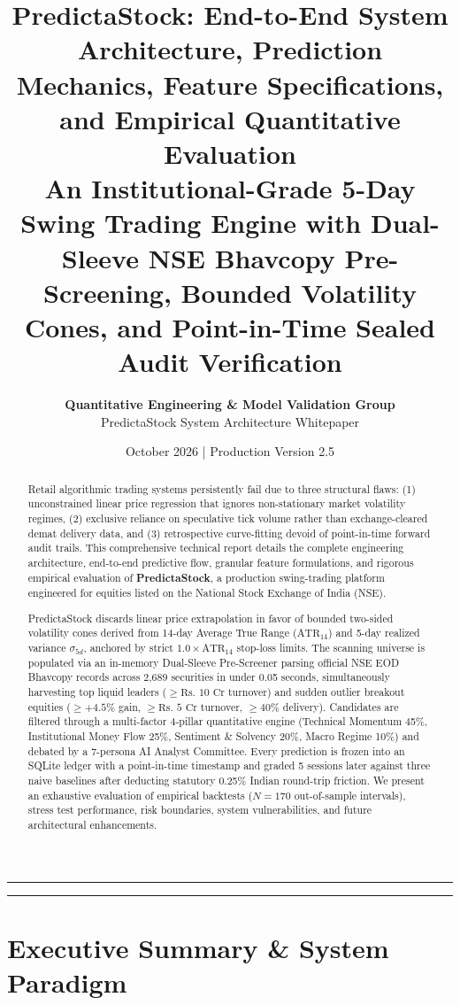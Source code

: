 \documentclass[11pt,a4paper]{article}
\title{\textbf{\LARGE PredictaStock: End-to-End System Architecture, Prediction Mechanics, Feature Specifications, and Empirical Quantitative Evaluation}\\[0.5em]
\large An Institutional-Grade 5-Day Swing Trading Engine with Dual-Sleeve NSE Bhavcopy Pre-Screening, Bounded Volatility Cones, and Point-in-Time Sealed Audit Verification}
\author{\textbf{Quantitative Engineering \& Model Validation Group} \\ PredictaStock System Architecture Whitepaper}
\date{October 2026 \quad | \quad Production Version 2.5}
\begin{document}
\maketitle

\begin{abstract}
Retail algorithmic trading systems persistently fail due to three structural flaws: (1) unconstrained linear price regression that ignores non-stationary market volatility regimes, (2) exclusive reliance on speculative tick volume rather than exchange-cleared demat delivery data, and (3) retrospective curve-fitting devoid of point-in-time forward audit trails. This comprehensive technical report details the complete engineering architecture, end-to-end predictive flow, granular feature formulations, and rigorous empirical evaluation of \textbf{PredictaStock}, a production swing-trading platform engineered for equities listed on the National Stock Exchange of India (NSE).

PredictaStock discards linear price extrapolation in favor of bounded two-sided volatility cones derived from 14-day Average True Range ($\text{ATR}_{14}$) and 5-day realized variance $\sigma_{5d}$, anchored by strict $1.0\times \text{ATR}_{14}$ stop-loss limits. The scanning universe is populated via an in-memory Dual-Sleeve Pre-Screener parsing official NSE EOD Bhavcopy records across 2,689 securities in under 0.05 seconds, simultaneously harvesting top liquid leaders ($\ge \text{Rs. } 10\text{ Cr}$ turnover) and sudden outlier breakout equities ($\ge +4.5\%$ gain, $\ge \text{Rs. } 5\text{ Cr}$ turnover, $\ge 40\%$ delivery). Candidates are filtered through a multi-factor 4-pillar quantitative engine (Technical Momentum 45\%, Institutional Money Flow 25\%, Sentiment \& Solvency 20\%, Macro Regime 10\%) and debated by a 7-persona AI Analyst Committee. Every prediction is frozen into an SQLite ledger with a point-in-time timestamp and graded 5 sessions later against three naive baselines after deducting statutory 0.25\% Indian round-trip friction. We present an exhaustive evaluation of empirical backtests ($N = 170$ out-of-sample intervals), stress test performance, risk boundaries, system vulnerabilities, and future architectural enhancements.
\end{abstract}

\vspace{1em}
\hrule
\vspace{1em}
\tableofcontents
\vspace{1em}
\hrule
\newpage

\section{Executive Summary \& System Paradigm}
\end{document}
